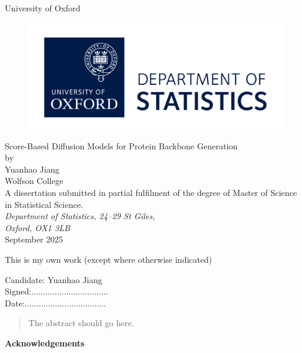 \documentclass[a4paper,12pt]{article}
\begin{document}

\begin{titlepage}
\begin{center}
\vspace{1cm}
\textsf{\Huge{University of Oxford \\}}
\vspace{1cm}
\begin{figure}[htb]
\centering
\includegraphics[scale=.8]{stats_logo_RGB.jpg}
\end{figure}
\vspace{2.0cm}
\Huge{Score-Based Diffusion Models for Protein Backbone Generation\\}
\vspace{2.0cm}
\large{ by \\[14pt] Yuanhao Jiang \\[8pt] Wolfson College} \\
\vspace{2.2cm}
\large{A dissertation submitted in partial fulfilment of the degree of Master of Science in Statistical Science.
} \\
\vspace{.5cm}
\large{\emph{Department of Statistics, 24--29 St Giles, \\Oxford, OX1 3LB}} \\
\vspace{1.0cm}
\large{September 2025} \\
\end{center}
\end{titlepage}
\clearpage

This is my own work (except where otherwise indicated)
\vspace{2.5in}

\begin{center}
Candidate: Yuanhao Jiang\\
\vspace{1.0in}
Signed:.................................\\
\vspace{1.0in}
Date:...................................
\end{center}
\clearpage
\begin{abstract}

The abstract should go here.

\end{abstract}
\clearpage
\vspace*{2in}
\begin{center}
\textbf{Acknowledgements}
\end{center}
\end{document}
